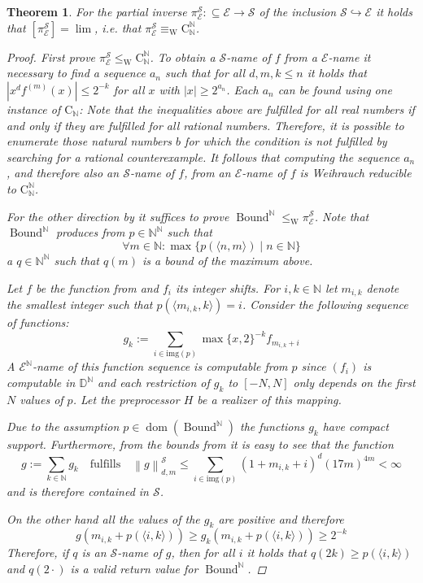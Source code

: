 \documentclass{eptcs-modified}
\newtheorem{theorem}{Theorem}
\newcommand{\Wd}[1]{\left[#1\right]}
\newcommand{\dom}{\operatorname{dom}}
\newcommand{\Baire}{{\mathbb{N}^\mathbb{N}}}
\newcommand{\leqW}{\leq_{\textrm{W}}}
\newcommand{\equivW}{\equiv_{\textrm{W}}}
\newcommand{\CCN}{\mathrm{C}_{\NN}}
\newcommand{\NN}{\mathbb{N}}
\newcommand{\DD}{\mathbb{D}}
\newcommand{\EE}{\mathcal E}
\newcommand{\SF}{\mathcal S}
\newcommand{\abs}[1]{\left|#1\right|}
\newcommand{\Bound}{\operatorname{Bound}}
\newcommand{\norm}[1]{\left\|#1\right\|}
\begin{document}
			\begin{theorem}
				For the partial inverse $\pi_{\EE}^\SF:\subseteq\EE\to \SF$ of the inclusion $\SF\hookrightarrow \EE$ it holds that $\Wd{\pi_{\EE}^\SF}=\lim$, i.e. that $\pi_\EE^\SF \equivW \CCN^\NN$.
				\begin{proof}
					First prove $\pi_\EE^\SF\leqW\CCN^\NN$.
					To obtain a $\SF$-name of $f$ from a $\EE$-name it necessary to find a sequence $a_n$ such that for all $d,m,k\leq n$ it holds that $\abs{x^df^{(m)}(x)}\leq 2^{-k}$ for all $x$ with $\abs{x}\geq 2^{a_n}$.
					Each $a_n$ can be found using one instance of $\CCN$:
					Note that the inequalities above are fulfilled for all real numbers if and only if they are fulfilled for all rational numbers.
					Therefore, it is possible to enumerate those natural numbers $b$ for which the condition is not fulfilled by searching for a rational counterexample.
					It follows that computing the sequence $a_n$, and therefore also an $\SF$-name of $f$, from an $\EE$-name of $f$ is Weihrauch reducible to $\CCN^\NN$.

					For the other direction by  it suffices to prove $\Bound^\NN\leqW\pi_\EE^\SF$.
					Note that $\Bound^\NN$ produces from $p\in\Baire$ such that
					\[ \forall m \in \NN :\max\{p(\langle n,m\rangle)\mid n\in\NN\} \]
					a $q\in\Baire$ such that $q(m)$ is a bound of the maximum above.

					Let $f$ be the function from  and $f_i$ its integer shifts.
					For $i,k\in\NN$ let $m_{i,k}$ denote the smallest integer such that $p(\langle m_{i,k},k\rangle)=i$.
					Consider the following sequence of functions:
					\[ g_k := \sum_{i\in\mathrm{img}(p)}\max\{x,2\}^{-k} f_{m_{i,k}+i} \]
					A $\EE^\NN$-name of this function sequence is computable from $p$ since $(f_i)$ is computable in $\DD^\NN$ and each restriction of $g_k$ to $[-N,N]$ only depends on the first $N$ values of $p$.
					Let the preprocessor $H$ be a realizer of this mapping.

					Due to the assumption $p\in\dom(\Bound^\NN)$ the functions $g_k$ have compact support.
					Furthermore, from the bounds from  it is easy to see that the function
					\[ g:= \sum_{k\in\NN} g_k \quad\text{fulfills}\quad \norm{g}^\SF_{d,m}\leq \sum_{i\in\mathrm{img}(p)} (1+m_{i,k} + i)^d(17m)^{4m} < \infty \]
					and is therefore contained in $\SF$.

					On the other hand all the values of the $g_k$ are positive and therefore
					\[ g(m_{i,k}+p(\langle i,k\rangle))\geq g_k(m_{i,k}+p(\langle i,k\rangle)) \geq 2^{-k} \]
					Therefore, if $q$ is an $\SF$-name of $g$, then for all $i$ it holds that $q(2k) \geq p(\langle i,k\rangle)$ and $q(2\cdot)$ is a valid return value for $\Bound^\NN$.
				\end{proof}
			\end{theorem}
			
\end{document}
